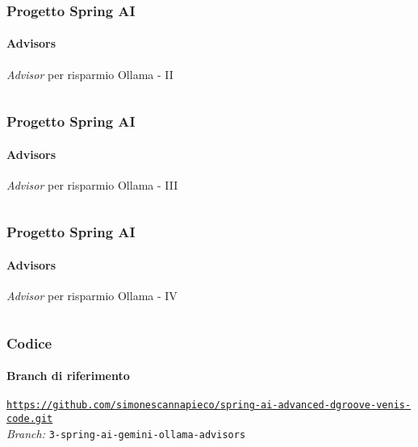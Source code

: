 %
\begin{frame}[t,fragile] \frametitle{Progetto Spring AI}
    \framesubtitle{Advisors}
        \vspace*{-.7cm}
        \begin{block}{\textit{Advisor} per risparmio Ollama - II}
			{\tiny\inputminted{java}{code/OllamaCostSavingsAdvisor-2.java}}
    	\end{block}
\end{frame}
%
\begin{frame}[t,fragile] \frametitle{Progetto Spring AI}
    \framesubtitle{Advisors}
        \vspace*{-.7cm}
        \begin{block}{\textit{Advisor} per risparmio Ollama - III}
			{\tiny\inputminted{java}{code/OllamaCostSavingsAdvisor-3.java}}
    	\end{block}
\end{frame}
%
\begin{frame}[t,fragile] \frametitle{Progetto Spring AI}
    \framesubtitle{Advisors}
        \vspace*{-.7cm}
        \begin{block}{\textit{Advisor} per risparmio Ollama - IV}
			{\tiny\inputminted{java}{code/OllamaCostSavingsAdvisor-4.java}}
    	\end{block}
\end{frame}
%
\begin{frame}[fragile] \frametitle{Codice}
    \framesubtitle{Branch di riferimento}
	\begin{center}
		{\scriptsize \href{https://github.com/simonescannapieco/spring-ai-advanced-dgroove-venis-code.git}{\texttt{https://github.com/simonescannapieco/spring-ai-advanced-dgroove-venis-code.git}}}\\
		\textit{Branch:} \alert{\texttt{3-spring-ai-gemini-ollama-advisors}}
	\end{center}
\end{frame}